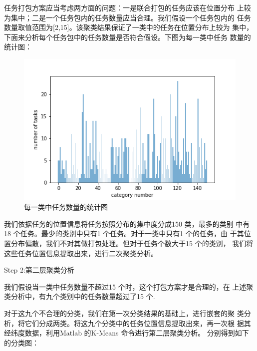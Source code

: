 任务打包方案应当考虑两方面的问题：一是联合打包的任务应该在位置分布
上较为集中；二是一个任务包内的任务数量应当合理。我们假设一个任务包内的
任务数量取值范围为[2,15]。该聚类结果保证了一类中的任务在位置分布上较为
集中，下面来分析每个任务包中的任务数量是否符合假设。下图为每一类中任务
数量的统计图：
\begin{figure}[H]
    \centering
    \includegraphics[width=1\textwidth]{tasks.png}
    \caption{每一类中任务数量的统计图}
    \label{}
\end{figure}

我们依据任务的位置信息将任务按照分布的集中度分成150 类，最多的类别
中有18 个任务。最少的类别中只有1 个任务。对于一类中只有1 个的任务，由
于其位置分布偏散，我们不对其做打包处理。但对于任务个数大于15 个的类别，
我们将这些任务位置信息提取出来，进行二次聚类分析。

Step 2:第二层聚类分析

我们假设当一类中任务数量不超过15 个时，这个打包方案才是合理的，在
上述聚类分析中，有九个类别中的任务数量超过了15 个.

对于这九个不合理的分类，我们在第一次分类结果的基础上，进行嵌套的聚
类分析，将它们分成两类。将这九个分类中的任务位置信息提取出来，再一次根
据其经纬度数据，利用Matlab 的K-Means 命令进行第二层聚类分析。
分别得到如下的分类图：

